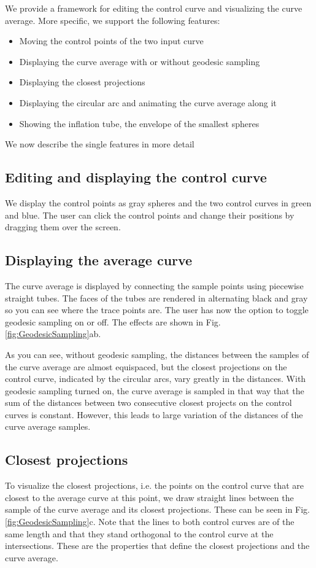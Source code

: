 \documentclass[journal, letterpaper]{IEEEtran}
\begin{document}
We provide a framework for editing the control curve and visualizing the curve average.
More specific, we support the following features: 
\begin{itemize}
	\item Moving the control points of the two input curve
	\item Displaying the curve average with or without geodesic sampling
	\item Displaying the closest projections
	\item Displaying the circular arc and animating the curve average along it
	\item Showing the inflation tube, the envelope of the smallest spheres
\end{itemize}
We now describe the single features in more detail

\subsection{Editing and displaying the control curve}
We display the control points as gray spheres and the two control curves in green and blue.
The user can click the control points and change their positions by dragging them over the screen.

\subsection{Displaying the average curve}
The curve average is displayed by connecting the sample points using piecewise straight tubes. The faces of the tubes are rendered in alternating black and gray so you can see where the trace points are.
The user has now the option to toggle geodesic sampling on or off. The effects are shown in Fig.\ref{fig:GeodesicSampling}ab. 

As you can see, without geodesic sampling, the distances between the samples of the curve average are almost equispaced, but the closest projections on the control curve, indicated by the circular arcs, vary greatly in the distances. With geodesic sampling turned on, the curve average is sampled in that way that the sum of the distances between two consecutive closest projects on the control curves is constant. However, this leads to large variation of the distances of the curve average samples.

\subsection{Closest projections}
To visualize the closest projections, i.e. the points on the control curve that are closest to the average curve at this point, we draw straight lines between the sample of the curve average and its closest projections. These can be seen in Fig.\ref{fig:GeodesicSampling}c. Note that the lines to both control curves are of the same length and that they stand orthogonal to the control curve at the intersections. These are the properties that define the closest projections and the curve average.
\end{document}
